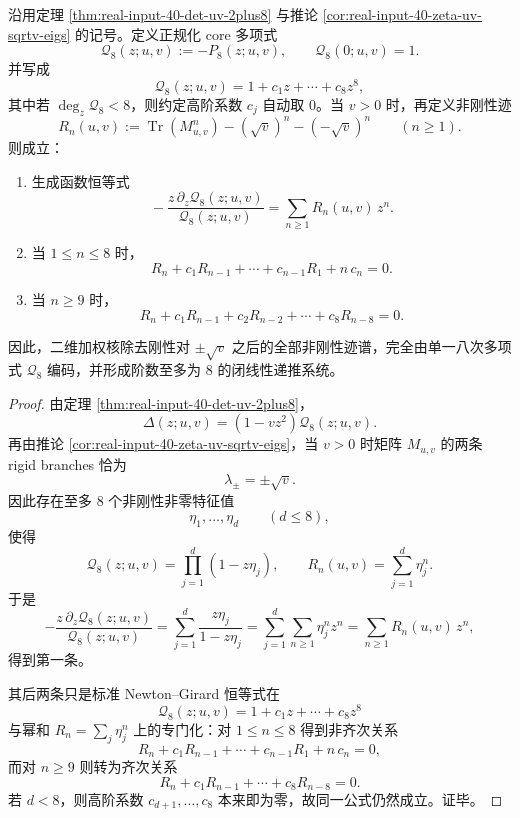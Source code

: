 \begin{theorem}\label{thm:xi-time-part73-nonrigid-trace-newton-cayley-closure}
沿用定理 \ref{thm:real-input-40-det-uv-2plus8} 与推论 \ref{cor:real-input-40-zeta-uv-sqrtv-eigs} 的记号。定义正规化 core 多项式
\[
\mathcal Q_8(z;u,v):=-P_8(z;u,v),
\qquad
\mathcal Q_8(0;u,v)=1.
\]
并写成
\[
\mathcal Q_8(z;u,v)=1+c_1z+\cdots+c_8z^8,
\]
其中若 \(\deg_z\mathcal Q_8<8\)，则约定高阶系数 \(c_j\) 自动取 \(0\)。当 \(v>0\) 时，再定义非刚性迹
\[
R_n(u,v):=\operatorname{Tr}(M_{u,v}^n)-(\sqrt v)^n-(-\sqrt v)^n
\qquad(n\ge 1).
\]
则成立：
\begin{enumerate}
  \item 生成函数恒等式
  \[
  \boxed{\;
  -\frac{z\,\partial_z\mathcal Q_8(z;u,v)}{\mathcal Q_8(z;u,v)}
  =
  \sum_{n\ge 1}R_n(u,v)\,z^n.\;}
  \]
  \item 当 \(1\le n\le 8\) 时，
  \[
  \boxed{\;
  R_n+c_1R_{n-1}+\cdots+c_{n-1}R_1+n\,c_n=0.\;}
  \]
  \item 当 \(n\ge 9\) 时，
  \[
  \boxed{\;
  R_n+c_1R_{n-1}+c_2R_{n-2}+\cdots+c_8R_{n-8}=0.\;}
  \]
\end{enumerate}
因此，二维加权核除去刚性对 \(\pm\sqrt v\) 之后的全部非刚性迹谱，完全由单一八次多项式 \(\mathcal Q_8\) 编码，并形成阶数至多为 \(8\) 的闭线性递推系统。
\end{theorem}
\begin{proof}
由定理 \ref{thm:real-input-40-det-uv-2plus8}，
\[
\Delta(z;u,v)=(1-vz^2)\mathcal Q_8(z;u,v).
\]
再由推论 \ref{cor:real-input-40-zeta-uv-sqrtv-eigs}，当 \(v>0\) 时矩阵 \(M_{u,v}\) 的两条 rigid branches 恰为
\[
\lambda_\pm=\pm\sqrt v.
\]
因此存在至多 \(8\) 个非刚性非零特征值
\[
\eta_1,\dots,\eta_d
\qquad(d\le 8),
\]
使得
\[
\mathcal Q_8(z;u,v)=\prod_{j=1}^{d}(1-z\eta_j),
\qquad
R_n(u,v)=\sum_{j=1}^{d}\eta_j^n.
\]
于是
\[
-\frac{z\,\partial_z\mathcal Q_8(z;u,v)}{\mathcal Q_8(z;u,v)}
=
\sum_{j=1}^{d}\frac{z\eta_j}{1-z\eta_j}
=
\sum_{j=1}^{d}\sum_{n\ge 1}\eta_j^n z^n
=
\sum_{n\ge 1}R_n(u,v)\,z^n,
\]
得到第一条。

其后两条只是标准 Newton--Girard 恒等式在
\[
\mathcal Q_8(z;u,v)=1+c_1z+\cdots+c_8z^8
\]
与幂和 \(R_n=\sum_j\eta_j^n\) 上的专门化：对 \(1\le n\le 8\) 得到非齐次关系
\[
R_n+c_1R_{n-1}+\cdots+c_{n-1}R_1+n\,c_n=0,
\]
而对 \(n\ge 9\) 则转为齐次关系
\[
R_n+c_1R_{n-1}+\cdots+c_8R_{n-8}=0.
\]
若 \(d<8\)，则高阶系数 \(c_{d+1},\dots,c_8\) 本来即为零，故同一公式仍然成立。证毕。
\end{proof}

